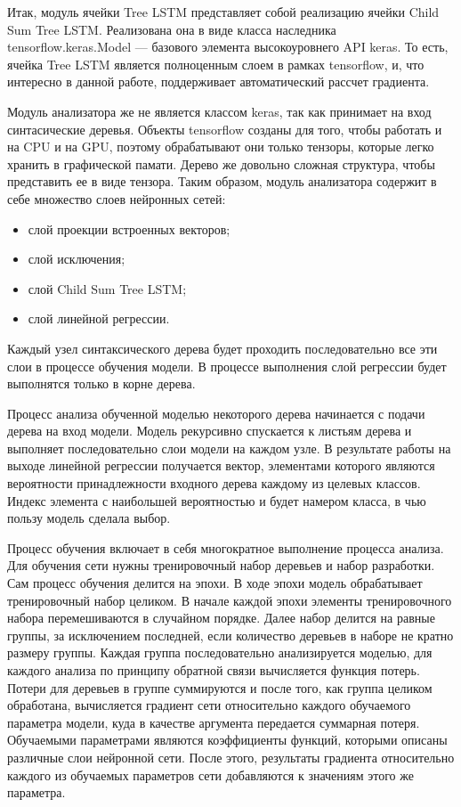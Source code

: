 Итак, модуль ячейки Tree LSTM представляет собой реализацию ячейки Child Sum Tree LSTM. Реализована она в виде класса наследника tensorflow.keras.Model --- базового элемента высокоуровнего API keras. То есть, ячейка Tree LSTM является полноценным слоем в рамках tensorflow, и, что интересно в данной работе, поддерживает автоматический рассчет градиента.

Модуль анализатора же не является классом keras, так как принимает на вход синтасические деревья. Объекты tensorflow созданы для того, чтобы работать и на CPU и на GPU, поэтому обрабатывают они только тензоры, которые легко хранить в графической памати. Дерево же довольно сложная структура, чтобы представить ее в виде тензора. Таким образом, модуль анализатора содержит в себе множество слоев нейронных сетей:

\begin{itemize}
\item слой проекции встроенных векторов;
\item слой исключения;
\item слой Child Sum Tree LSTM;
\item слой линейной регрессии.
\end{itemize}

Каждый узел синтаксического дерева будет проходить последовательно все эти слои в процессе обучения модели. В процессе выполнения слой регрессии будет выполнятся только в корне дерева.

Процесс анализа обученной моделью некоторого дерева начинается с подачи дерева на вход модели. Модель рекурсивно спускается к листьям дерева и выполняет последовательно слои модели на каждом узле. В результате работы на выходе линейной регрессии получается вектор, элементами которого являются вероятности принадлежности входного дерева каждому из целевых классов. Индекс элемента с наибольшей вероятностью и будет намером класса, в чью пользу модель сделала выбор.

Процесс обучения включает в себя многократное выполнение процесса анализа. Для обучения сети нужны тренировочный набор деревьев и набор разработки. Сам процесс обучения делится на эпохи. В ходе эпохи модель обрабатывает тренировочный набор целиком. В начале каждой эпохи элементы тренировочного набора перемешиваются в случайном порядке. Далее набор делится на равные группы, за исключением последней, если количество деревьев в наборе не кратно размеру группы. Каждая группа последовательно анализируется моделью, для каждого анализа по принципу обратной связи вычисляется функция потерь. Потери для деревьев в группе суммируются и после того, как группа целиком обработана, вычисляется градиент сети относительно каждого обучаемого параметра модели, куда в качестве аргумента передается суммарная потеря. Обучаемыми параметрами являются коэффициенты функций, которыми описаны различные слои нейронной сети. После этого, результаты градиента относительно каждого из обучаемых параметров сети добавляются к значениям этого же параметра.

